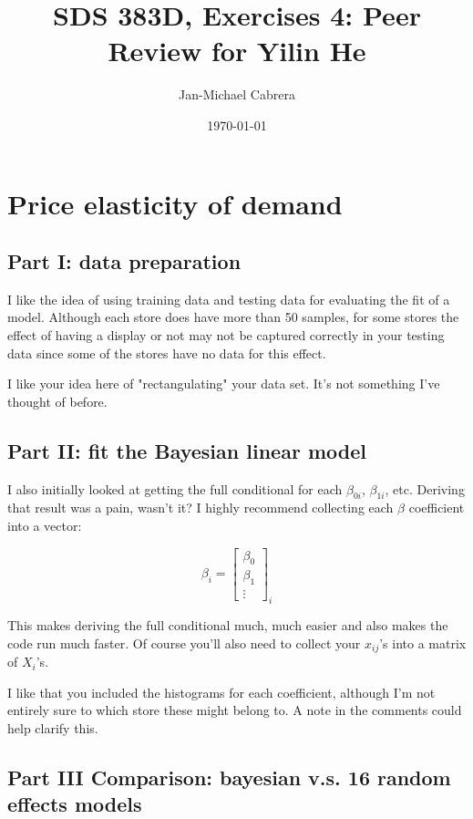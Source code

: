 \documentclass[12pt]{article}
\begin{document}
    \title{SDS 383D, Exercises 4: Peer Review for Yilin He}
    \author{Jan-Michael Cabrera}
    \date{\today}
    \maketitle

    \section*{Price elasticity of demand}

    \subsection*{Part I: data preparation}

    I like the idea of using training data and testing data for evaluating the fit of a model. Although each store does have more than 50 samples, for some stores the effect of having a display or not may not be captured correctly in your testing data since some of the stores have no data for this effect. 

    I like your idea here of "rectangulating" your data set. It's not something I've thought of before.

    \subsection*{Part II: fit the Bayesian linear model}

    I also initially looked at getting the full conditional for each $\beta_{0i}$, $\beta_{1i}$, etc. Deriving that result was a pain, wasn't it? I highly recommend collecting each $\beta$ coefficient into a vector:

    $$\beta_i = \begin{bmatrix} \beta_0 \\ \beta_1 \\ \vdots  \end{bmatrix}_i$$

    \noindent This makes deriving the full conditional much, much easier and also makes the code run much faster. Of course you'll also need to collect your $x_{ij}$'s into a matrix of $X_i$'s. 

    I like that you included the histograms for each coefficient, although I'm not entirely sure to which store these might belong to. A note in the comments could help clarify this.

    \subsection*{Part III Comparison: bayesian v.s. 16 random effects models}
\end{document}
